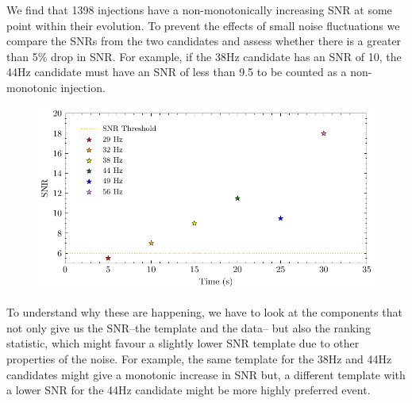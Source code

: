 We find that 1398 injections have a non-monotonically increasing SNR at some point within their evolution. To prevent the effects of small noise fluctuations we compare the SNRs from the two candidates and assess whether there is a greater than 5\% drop in SNR. For example, if the 38Hz candidate has an SNR of 10, the 44Hz candidate must have an SNR of less than 9.5 to be counted as a non-monotonic injection.
%
\begin{figure}
       \centering
    \includegraphics[width=\textwidth]{images/6_earlywarning/identified-problems/non_mono_snr.pdf}
    \caption{}
    \label{6:fig:non-monotonic-snr}
\end{figure}
%
To understand why these are happening, we have to look at the components that not only give us the SNR--the template and the data-- but also the ranking statistic, which might favour a slightly lower SNR template due to other properties of the noise. For example, the same template for the 38Hz and 44Hz candidates might give a monotonic increase in SNR but, a different template with a lower SNR for the 44Hz candidate might be more highly preferred event.

